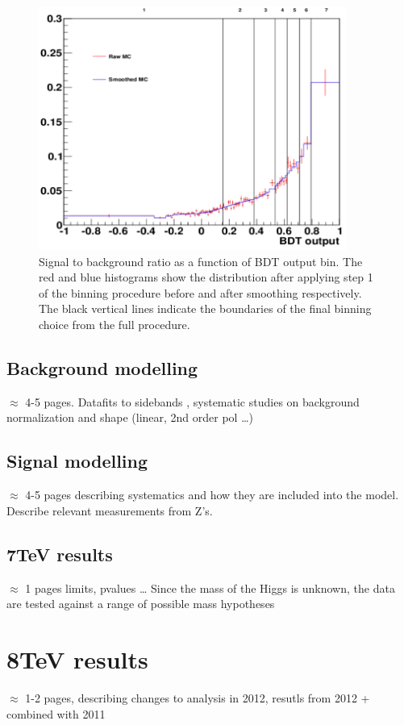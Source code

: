 \begin{figure}
 \begin{centering}
  \includegraphics[width=0.9\textwidth]{hgg7TeV/sidebandMvaPlots/binningscheme.png}
 \end{centering}
 \caption{Signal to background ratio as a function of BDT output bin.
 The red and blue histograms show the distribution after applying step 1 of the binning procedure before
and after smoothing respectively. The black vertical lines indicate the boundaries of the final
binning choice from the full procedure.}
 \label{fig:binningscheme}
\end{figure}



\subsection{Background modelling}

$\approx$ 4-5 pages. Datafits to sidebands ,
systematic studies on background normalization
and shape (linear, 2nd order pol \ldots)

\subsection{Signal modelling}
$\approx$ 4-5 pages describing systematics and how they are included into 
the model. Describe relevant measurements from Z's.

\subsection{7TeV results}
$\approx$ 1 pages limits, pvalues \ldots
Since the mass of the Higgs is unknown, the data are tested against a range of possible mass hypotheses

\section{8TeV results}
$\approx$ 1-2 pages, describing changes to analysis in 2012,
resutls from 2012 + combined with 2011 
